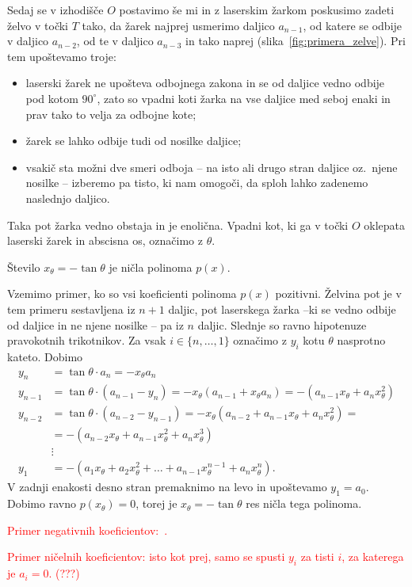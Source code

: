 Sedaj se v izhodišče $O$ postavimo še mi in z laserskim žarkom poskusimo zadeti želvo v točki $T$ tako, da žarek najprej usmerimo daljico $a_{n-1}$, od katere se odbije v daljico $a_{n-2}$, od te v daljico $a_{n-3}$ in tako naprej (slika~\ref{fig:primera_zelve}). Pri tem upoštevamo troje:
\begin{itemize}
    \item laserski žarek ne upošteva odbojnega zakona in se od daljice vedno odbije pod kotom $90^\circ$, zato so vpadni koti žarka na vse daljice med seboj enaki in prav tako to velja za odbojne kote;
    \item žarek se lahko odbije tudi od nosilke daljice;
    \item vsakič sta možni dve smeri odboja -- na isto ali drugo stran daljice oz.\ njene nosilke -- izberemo pa tisto, ki nam omogoči, da sploh lahko zadenemo naslednjo daljico.
\end{itemize}
Taka pot žarka vedno obstaja in je enolična. Vpadni kot, ki ga v točki $O$ oklepata laserski žarek in abscisna os, označimo z $\theta$.

\begin{trditev}
    Število $x_{\theta} = - \tan \theta$ je ničla polinoma $p(x)$.
\end{trditev}

\begin{dokaz}
    Vzemimo primer, ko so vsi koeficienti polinoma $p(x)$ pozitivni. Želvina pot je v tem primeru sestavljena iz $n+1$ daljic, pot laserskega žarka --ki se vedno odbije od daljice in ne njene nosilke -- pa iz $n$ daljic. Slednje so ravno hipotenuze pravokotnih trikotnikov. Za vsak $i \in \{n, \ldots, 1\}$ označimo z $y_i$ kotu $\theta$ nasprotno kateto. Dobimo
    \begin{align*}
        y_n &= \tan \theta \cdot a_n = - x_{\theta} a_n \\
        y_{n-1} &= \tan \theta \cdot (a_{n-1} - y_n) = - x_{\theta} (a_{n-1} + x_{\theta} a_n) = - (a_{n-1} x_{\theta} + a_n x_{\theta}^2)\\
        y_{n-2} &= \tan \theta \cdot (a_{n-2} - y_{n-1}) = - x_{\theta} (a_{n-2} + a_{n-1} x_{\theta} + a_n x_{\theta}^2) = \\
        &= - (a_{n-2} x_{\theta} + a_{n-1} x_{\theta}^2 + a_n x_{\theta}^3) \\
        &\vdots \\
        y_1 &= - (a_1 x_{\theta} + a_2 x_{\theta}^2 + \ldots + a_{n-1} x_{\theta}^{n-1} + a_n x_{\theta}^n).
    \end{align*}
    V zadnji enakosti desno stran premaknimo na levo in upoštevamo $y_1 = a_0$. Dobimo ravno $p(x_{\theta}) = 0$, torej je $x_{\theta} = - \tan \theta$ res ničla tega polinoma.

    \textcolor{red}{Primer negativnih koeficientov:~\cite[str.\ 36]{zore2022}.}

    \textcolor{red}{Primer ničelnih koeficientov: isto kot prej, samo se spusti $y_i$ za tisti $i$, za katerega je $a_i = 0$. (\textcolor{red}{???})}
\end{dokaz}

